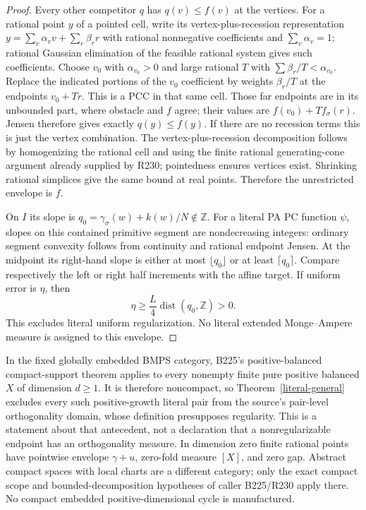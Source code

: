 \documentclass[11pt]{article}
\newcommand{\Z}{\mathbb Z}
\begin{document}
\begin{proof}
Every other competitor $q$ has $q(v)\leq f(v)$ at the vertices.
For a rational point $y$ of a pointed cell, write its vertex-plus-recession
representation $y=\sum_v\alpha_vv+\sum_r\beta_rr$ with rational
nonnegative coefficients and $\sum_v\alpha_v=1$; rational Gaussian
elimination of the feasible rational system gives such coefficients.
Choose $v_0$ with $\alpha_{v_0}>0$ and large rational $T$ with
$\sum\beta_r/T<\alpha_{v_0}$. Replace the indicated portions of the
$v_0$ coefficient by weights $\beta_r/T$ at the endpoints $v_0+Tr$.
This is a PCC in that same cell. Those far endpoints are in its
unbounded part, where obstacle and $f$ agree; their values are
$f(v_0)+T f_\sigma(r)$. Jensen therefore gives exactly $q(y)\leq f(y)$.
If there are no recession terms this is just the vertex combination.
The vertex-plus-recession decomposition follows by homogenizing the
rational cell and using the finite rational generating-cone argument
already supplied by R230; pointedness ensures vertices exist.
Shrinking rational simplices give the same bound at real points.
Therefore the unrestricted envelope is $f$.

On $I$ its slope is $q_0=\gamma_\sigma(w)+k(w)/N\notin\Z$.
For a literal PA PC function $\psi$, slopes on this contained primitive
segment are nondecreasing integers: ordinary segment convexity follows
from continuity and rational endpoint Jensen. At the midpoint its
right-hand slope is either at most $\lfloor q_0\rfloor$ or at least
$\lceil q_0\rceil$. Compare respectively the left or right half
increments with the affine target. If uniform error is $\eta$, then
\[
 \eta\geq\frac L4\operatorname{dist}(q_0,\Z)>0.
\]
This excludes literal uniform regularization. No literal extended
Monge--Ampere measure is assigned to this envelope.
\end{proof}

In the fixed globally embedded BMPS category, B225's positive-balanced
compact-support theorem applies to every nonempty finite pure positive
balanced $X$ of dimension $d\geq1$. It is therefore noncompact, so
Theorem~\ref{literal-general} excludes every such positive-growth
literal pair from the source's pair-level orthogonality domain, whose
definition presupposes regularity. This is a statement about that
antecedent, not a declaration that a nonregularizable endpoint has
an orthogonality measure. In dimension zero finite rational points
have pointwise envelope $\gamma+u$, zero-fold measure $[X]$, and zero
gap. Abstract compact spaces with local charts are a different category;
only the exact compact scope and bounded-decomposition hypotheses of
caller B225/R230 apply there. No compact embedded positive-dimensional
cycle is manufactured.
\end{document}
